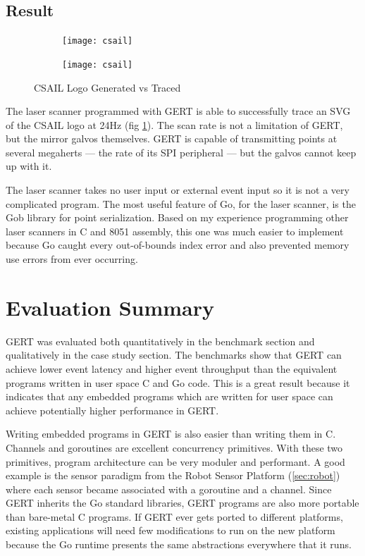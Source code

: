 \subsection{Result}
\begin{figure}[h]
  \begin{subfigure}[t!]{0.5\textwidth}
 \texttt{[image: csail]}
  \end{subfigure}
  \begin{subfigure}[t!]{0.5\textwidth}
 \texttt{[image: csail]}
  \end{subfigure}
  \caption{CSAIL Logo Generated vs Traced} \label{fig:trace_v_reality}
\end{figure}
The laser scanner programmed with GERT is able to successfully trace an SVG of the CSAIL logo
at 24Hz (fig \ref{fig:trace_v_reality}). The scan rate is not a limitation of GERT, but the mirror galvos themselves. GERT is
capable of transmitting points at several megaherts --- the rate of its SPI peripheral --- but the galvos
cannot keep up with it.

The laser scanner takes no user input or external event input so it is not a very complicated program.
The most useful feature of Go, for the laser scanner, is the Gob library for point serialization.
Based on my experience programming other laser scanners in C and 8051 assembly, this one was much easier to implement because
Go caught every out-of-bounds index error and also prevented memory use errors from ever occurring.

\section{Evaluation Summary}
GERT was evaluated both quantitatively in the benchmark section and qualitatively in the case study section.
The benchmarks show that GERT can achieve lower event latency and higher event throughput than the equivalent
programs written in user space C and Go code. This is a great result because it indicates that any embedded programs
which are written for user space can achieve potentially higher performance in GERT.

Writing embedded programs in GERT is also easier than writing them in C. Channels
and goroutines are excellent concurrency primitives. With these two primitives, program architecture can be very moduler
and performant. A good example is the sensor paradigm from the Robot Sensor Platform (\ref{sec:robot}) where each
sensor became associated with a goroutine and a channel. Since GERT inherits the Go standard libraries, GERT programs
are also more portable than bare-metal C programs. If GERT ever gets ported to different platforms, existing applications
will need few modifications to run on the new platform because the Go runtime presents the same abstractions everywhere
that it runs.

